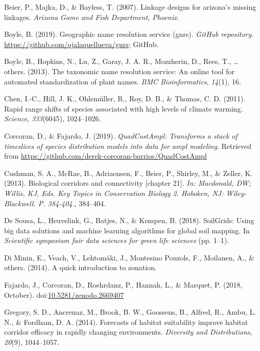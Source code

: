 \documentclass[]{article}
\begin{document}
\leavevmode\hypertarget{ref-beier2007linkage}{}%
Beier, P., Majka, D., \& Bayless, T. (2007). Linkage designs for arizona's missing linkages. \emph{Arizona Game and Fish Department, Phoenix}.

\leavevmode\hypertarget{ref-Boyle2019GNRS}{}%
Boyle, B. (2019). Geographic name resolution service (gnrs). \emph{GitHub repository}. \url{https://github.com/ojalaquellueva/gnrs}; GitHub.

\leavevmode\hypertarget{ref-boyle2013taxonomic}{}%
Boyle, B., Hopkins, N., Lu, Z., Garay, J. A. R., Mozzherin, D., Rees, T., \ldots{} others. (2013). The taxonomic name resolution service: An online tool for automated standardization of plant names. \emph{BMC Bioinformatics}, \emph{14}(1), 16.

\leavevmode\hypertarget{ref-chen2011rapid}{}%
Chen, I.-C., Hill, J. K., Ohlemüller, R., Roy, D. B., \& Thomas, C. D. (2011). Rapid range shifts of species associated with high levels of climate warming. \emph{Science}, \emph{333}(6045), 1024--1026.

\leavevmode\hypertarget{ref-Corcoran_Quadcost}{}%
Corcoran, D., \& Fajardo, J. (2019). \emph{QuadCostAmpl: Transforms a stack of timeslices of species distribution models into data for ampl modeling}. Retrieved from \url{https://github.com/derek-corcoran-barrios/QuadCostAmpl}

\leavevmode\hypertarget{ref-cushman2013biological}{}%
Cushman, S. A., McRae, B., Adriaensen, F., Beier, P., Shirley, M., \& Zeller, K. (2013). Biological corridors and connectivity {[}chapter 21{]}. \emph{In: Macdonald, DW; Willis, KJ, Eds. Key Topics in Conservation Biology 2. Hoboken, NJ: Wiley-Blackwell. P. 384-404.}, 384--404.

\leavevmode\hypertarget{ref-de2018soilgrids}{}%
De Sousa, L., Heuvelink, G., Batjes, N., \& Kempen, B. (2018). SoilGrids: Using big data solutions and machine learning algorithms for global soil mapping. In \emph{Scientific symposium fair data sciences for green life sciences} (pp. 1--1).

\leavevmode\hypertarget{ref-di2014quick}{}%
Di Minin, E., Veach, V., Lehtomäki, J., Montesino Pouzols, F., Moilanen, A., \& others. (2014). A quick introduction to zonation.

\leavevmode\hypertarget{ref-fajardo_javier_2018_2669407}{}%
Fajardo, J., Corcoran, D., Roehrdanz, P., Hannah, L., \& Marquet, P. (2018, October). doi:\href{https://doi.org/10.5281/zenodo.2669407}{10.5281/zenodo.2669407}

\leavevmode\hypertarget{ref-gregory2014forecasts}{}%
Gregory, S. D., Ancrenaz, M., Brook, B. W., Goossens, B., Alfred, R., Ambu, L. N., \& Fordham, D. A. (2014). Forecasts of habitat suitability improve habitat corridor efficacy in rapidly changing environments. \emph{Diversity and Distributions}, \emph{20}(9), 1044--1057.
\end{document}
